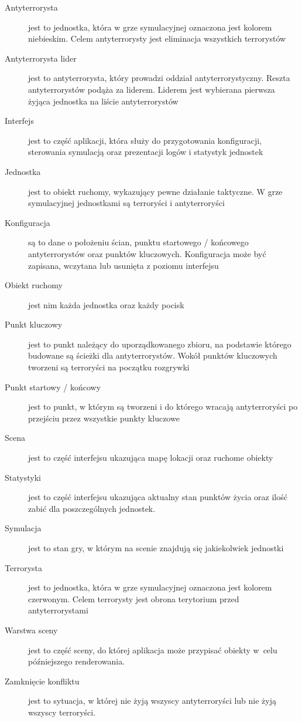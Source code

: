 \begin{description}
	\item[Antyterrorysta] jest to jednostka, która w grze symulacyjnej oznaczona jest kolorem niebieskim. Celem antyterrorysty jest eliminacja wszystkich terrorystów
	\item[Antyterrorysta lider] jest to antyterrorysta, który prowadzi oddział antyterrorystyczny. Reszta antyterrorystów podąża za liderem. Liderem jest wybierana pierwsza żyjąca jednostka na liście antyterrorystów
	\item[Interfejs] jest to część aplikacji, która służy do przygotowania konfiguracji, sterowania symulacją oraz prezentacji logów i statystyk jednostek
	\item[Jednostka] jest to obiekt ruchomy, wykazujący pewne działanie taktyczne. W grze symulacyjnej jednostkami są terroryści i antyterroryści
	\item[Konfiguracja] są to dane o położeniu ścian, punktu startowego / końcowego antyterrorystów oraz punktów kluczowych. Konfiguracja może być zapisana, wczytana lub usunięta z poziomu interfejsu
	\item[Obiekt ruchomy] jest nim każda jednostka oraz każdy pocisk
	\item[Punkt kluczowy] jest to punkt należący do uporządkowanego zbioru, na podstawie którego budowane są ścieżki dla antyterrorystów. Wokół punktów kluczowych tworzeni są terroryści na początku rozgrywki
	\item[Punkt startowy / końcowy] jest to punkt, w którym są tworzeni i do którego wracają antyterroryści po przejściu przez wszystkie punkty kluczowe
	\item[Scena] jest to część interfejsu ukazująca mapę lokacji oraz ruchome obiekty
	\item[Statystyki] jest to część interfejsu ukazująca aktualny stan punktów życia oraz ilość zabić dla poszczególnych jednostek.
	\item[Symulacja] jest to stan gry, w którym na scenie znajdują się jakiekolwiek jednostki	
	\item[Terrorysta] jest to jednostka, która w grze symulacyjnej oznaczona jest kolorem czerwonym. Celem terrorysty jest obrona terytorium przed antyterrorystami
	\item[Warstwa sceny] jest to część sceny, do której aplikacja może przypisać obiekty w~celu późniejszego renderowania.
	\item[Zamknięcie konfliktu] jest to sytuacja, w której nie żyją wszyscy antyterroryści lub nie żyją wszyscy terroryści.
\end{description}


